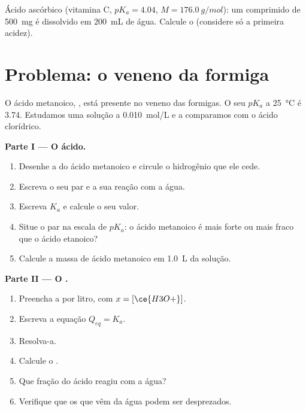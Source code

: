 \begin{exercise}[$\star\star\star$]\label{exo:g12:ka-and-pka:15}
Ácido ascórbico (vitamina C, $pK_a = 4.04$, $M = \qty{176.0}{g/mol}$): um
comprimido de \qty{500}{mg} é dissolvido em \qty{200}{mL} de água.
Calcule o  (considere só a primeira acidez).
\end{exercise}

\section{Problema: o veneno da formiga}


\begin{problem}
\label{pb:g12:ka-and-pka:1}
O ácido metanoico, , está presente no veneno das formigas. O
seu $pK_a$ a \qty{25}{\celsius} é 3.74. Estudamos uma solução a
\qty{0.010}{mol/L} e a comparamos com o ácido clorídrico.

\medskip
\noindent\textbf{Parte I --- O ácido.}
\begin{enumerate}
  \item Desenhe a  do ácido metanoico e circule o
        hidrogênio que ele cede.
  \item Escreva o seu par e a sua reação com a água.
  \item Escreva $K_a$ e calcule o seu valor.
  \item Situe o par na escala de $pK_a$: o ácido metanoico é mais forte
        ou mais fraco que o ácido etanoico?
  \item Calcule a massa de ácido metanoico em \qty{1.0}{L} da solução.
\end{enumerate}

\medskip
\noindent\textbf{Parte II --- O .}
\begin{enumerate}[resume]
  \item Preencha a  por litro, com $x = [\ce{H3O+}]$.
  \item Escreva a equação $Q_{eq} = K_a$.
  \item Resolva-a.
  \item Calcule o .
  \item Que fração do ácido reagiu com a água?
  \item Verifique que os  que vêm da água podem ser desprezados.
\end{enumerate}


\end{problem}

